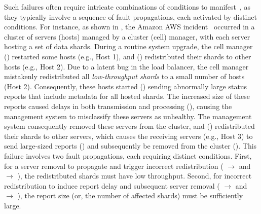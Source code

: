 Such failures often require intricate combinations of conditions 
to manifest~\cite{qian2023vicious}, 
as they typically involve a sequence of fault propagations, 
each activated by distinct conditions. 
For instance, 
as shown in , 
the Amazon AWS incident~\cite{AWSOutage2024} 
occurred in a cluster of servers (hosts) 
managed by a cluster (cell) manager, 
with each server hosting a set of data shards. 
During a routine system upgrade, 
the cell manager () restarted some hosts (e.g., Host 1), 
and () redistributed 
their shards to other hosts (e.g., Host 2). 
Due to a latent bug in the load balancer, 
the cell manager mistakenly redistributed 
all \textit{low-throughput shards} 
to a small number of hosts (Host 2). 
Consequently, 
these hosts started 
() sending abnormally large status reports 
that include metadata for all hosted shards. 
The increased size of these reports caused delays 
in both transmission and processing (), 
causing the management system to misclassify these servers as unhealthy. 
The management system consequently 
removed these servers from the cluster, 
and () redistributed their shards to other servers, 
which causes the receiving servers (e.g., Host 3) to send large-sized reports ()
and subsequently be removed from the cluster (). 
This failure involves two fault propagations, 
each requiring distinct conditions.
First, for a server removal to propagate and trigger incorrect redistribution 
( $\rightarrow$  and  $\rightarrow$ ), the redistributed shards must have low throughput. 
Second, for incorrect redistribution to induce report delay and subsequent server removal
( $\rightarrow$  and  $\rightarrow$ ), 
the report size (or, the number of affected shards) must be sufficiently large. 





